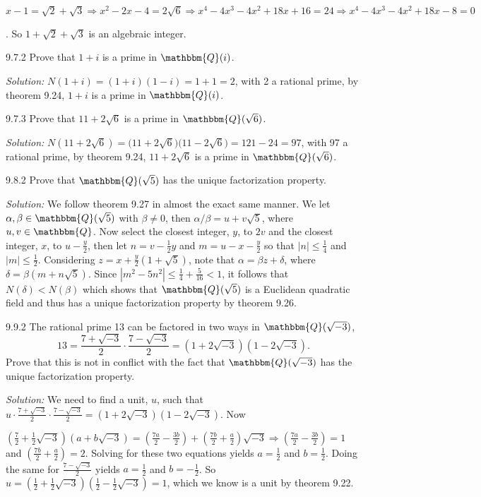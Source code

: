 \documentclass{letter}
\newcommand{\tmem}[1]{{\em #1\/}}
\begin{document}
$x - 1 = \sqrt{2} + \sqrt{3} \Rightarrow x^2 - 2 x - 4 = 2 \sqrt{6}
\Rightarrow x^4 - 4 x^3 - 4 x^2 + 18 x + 16 = 24 \Rightarrow x^4 - 4 x^3 - 4
x^2 + 18 x - 8 = 0$

. So $1 + \sqrt{2} + \sqrt{3}$ is an algebraic integer.

9.7.2 Prove that $1 + i$ is a prime in $\mathbbm{Q}(i)$.

{\tmem{Solution:}} $N (1 + i) = (1 + i) (1 - i) = 1 + 1 = 2$, with 2 a
rational prime, by theorem 9.24, $1 + i$ is a prime in $\mathbbm{Q}(i)$.

9.7.3 Prove that $11 + 2 \sqrt{6}$ is a prime in $\mathbbm{Q}( \sqrt{6})$.

{\tmem{Solution:}} $N ( \text{$11 + 2 \sqrt{6}$}) = \text{$(11 + 2 \sqrt{6}$)}
\text{($11 - 2 \sqrt{6}$)} = 121 - 24 = 97$, with 97 a rational prime, by
theorem 9.24, $11 + 2 \sqrt{6}$ is a prime in $\mathbbm{Q}( \sqrt{6})$.

9.8.2 Prove that $\mathbbm{Q}( \sqrt{5})$ has the unique factorization
property.

{\tmem{Solution:}} We follow theorem 9.27 in almost the exact same manner. We
let $\alpha, \beta \in \mathbbm{Q}( \sqrt{5})$ with $\beta \neq 0$, then
$\alpha / \beta = u + v \sqrt{5}$, where $u, v \in \mathbbm{Q}$. Now select
the closest integer, $y$, to $2 v$ and the closest integer, $x$, to $u -
\frac{y}{2}$, then let $n = v - \frac{1}{2} y$ and $m = u - x - \frac{y}{2}$
so that $|n| \leq \frac{1}{4}$ and $|m| \leq \frac{1}{2}$. Considering $z = x
+ \frac{y}{2} (1 + \sqrt{5})$, note that $\alpha = \beta z + \delta$, where
$\delta = \beta (m + n \sqrt{5})$. Since $|m^2 - 5 n^2 | \leq \frac{1}{4} +
\frac{5}{16} < 1$, it follows that $N (\delta) < N (\beta)$ which shows that
$\mathbbm{Q}( \sqrt{5})$ is a Euclidean quadratic field and thus has a unique
factorization property by theorem 9.26.

9.9.2 The rational prime 13 can be factored in two ways in $\mathbbm{Q}(
\sqrt{- 3})$,
\[ 13 = \frac{7 + \sqrt{- 3}}{2} \cdot \frac{7 - \sqrt{- 3}}{2} = (1 + 2
   \sqrt{- 3}) (1 - 2 \sqrt{- 3}) . \]
Prove that this is not in conflict with the fact that $\mathbbm{Q}( \sqrt{-
3})$ has the unique factorization property.

{\tmem{Solution:}} We need to find a unit, $u$, such that $u \cdot \frac{7 +
\sqrt{- 3}}{2} \cdot \frac{7 - \sqrt{- 3}}{2} = (1 + 2 \sqrt{- 3}) (1 - 2
\sqrt{- 3}) .$ Now

$( \frac{7}{2} + \frac{1}{2} \sqrt{- 3}) (a + b \sqrt{- 3}) = ( \frac{7 a}{2}
- \frac{3 b}{2}) + ( \frac{7 b}{2} + \frac{a}{2}) \sqrt{- 3} \Rightarrow (
\frac{7 a}{2} - \frac{3 b}{2}) = 1$ and $( \frac{7 b}{2} + \frac{a}{2}) = 2$.
Solving for these two equations yields $a = \frac{1}{2}$ and $b =
\frac{1}{2}$. Doing the same for $\frac{7 - \sqrt{- 3}}{2}$ yields $a =
\frac{1}{2}$ and $b = - \frac{1}{2}$. So $u = ( \frac{1}{2} + \frac{1}{2}
\sqrt{- 3}) ( \frac{1}{2} - \frac{1}{2} \sqrt{- 3}) = 1$, which we know is a
unit by theorem 9.22.
\end{document}
